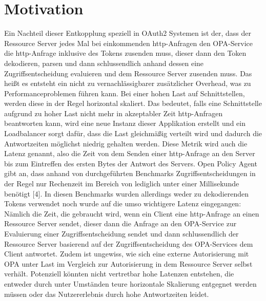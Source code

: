 \section{Motivation}
\label{sec:intro:motivation}
Ein Nachteil dieser Entkopplung speziell in OAuth2 Systemen ist der, dass der Ressource Server jedes Mal bei einkommenden http-Anfragen den OPA-Service die http-Anfrage inklusive des Tokens zusenden muss, dieser dann den Token dekodieren, parsen und dann schlussendlich anhand dessen eine Zugriffsentscheidung evaluieren und dem Ressource Server zusenden muss. Das heißt es entsteht ein nicht zu vernachlässigbarer zusätzlicher Overhead, was zu Performanceproblemen führen kann. Bei einer hohen Last auf Schnittstellen, werden diese in der Regel horizontal skaliert. Das bedeutet, falls eine Schnittstelle aufgrund zu hoher Last nicht mehr in akzeptabler Zeit http-Anfragen beantworten kann, wird eine neue Instanz dieser Applikation erstellt und ein Loadbalancer sorgt dafür, dass die Last gleichmäßig verteilt wird und dadurch die Antwortzeiten möglichst niedrig gehalten werden. Diese Metrik wird auch die Latenz genannt, also die Zeit von dem Senden einer http-Anfrage an den Server bis zum Eintreffen des ersten Bytes der Antwort des Servers. 
Open Policy Agent gibt an, dass anhand von durchgeführten Benchmarks Zugriffsentscheidungen in der Regel nur Rechenzeit im Bereich von lediglich unter einer Millisekunde benötigt [4]. In diesen Benchmarks wurden allerdings weder zu dekodierenden Tokens verwendet noch wurde auf die umso wichtigere Latenz eingegangen: Nämlich die Zeit, die gebraucht wird, wenn ein Client eine http-Anfrage an einen Ressource Server sendet, dieser dann die Anfrage an den OPA-Service zur Evaluierung einer Zugriffsentscheidung sendet und dann schlussendlich der Ressource Server basierend auf der Zugriffsentscheidung des OPA-Services dem Client antwortet. Zudem ist ungewiss, wie sich eine externe Autorisierung mit OPA unter Last im Vergleich zur Autorisierung in dem Ressource Server selbst verhält. Potenziell könnten nicht vertretbar hohe Latenzen entstehen, die entweder durch unter Umständen teure horizontale Skalierung entgegnet werden müssen oder das Nutzererlebnis durch hohe Antwortzeiten leidet.

%
%
